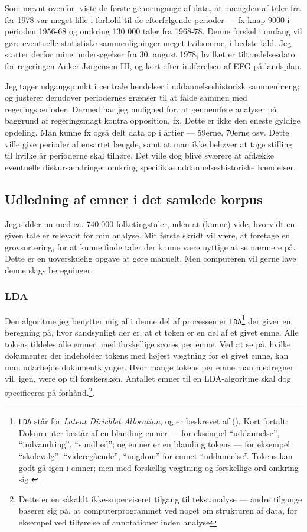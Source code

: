 Som nævnt ovenfor, viste de første gennemgange af data, at mængden af taler fra før 1978 var meget lille i forhold til de efterfølgende perioder — fx knap 9000 i perioden 1956-68 og omkring 130 000 taler fra 1968-78.
Denne forskel i omfang vil gøre eventuelle statistiske sammenligninger meget tvilsomme, i bedste fald.
Jeg starter derfor mine undersøgelser fra 30. august 1978, hvilket er tiltrædelsesdato for regeringen Anker Jørgensen III, og kort efter indførelsen af EFG på landsplan.

Jeg tager udgangspunkt i centrale hendelser i uddannelseshistorisk sammenhæng; og justerer derudover periodernes grænser til at falde sammen med regeringsperioder.
Dermed har jeg mulighed for, at gennemføre analyser på baggrund af regeringsmagt kontra opposition, fx.
Dette er ikke den eneste gyldige opdeling.
Man kunne fx også delt data op i årtier — 59erne, 70erne osv.
Dette ville give perioder af ensartet længde, samt at man ikke behøver at tage stilling til hvilke år perioderne skal tilhøre.
Det ville dog blive sværere at afdække eventuelle diskursændringer omkring specifikke uddannelseshistoriske hændelser.

\subsection{Udledning af emner i det samlede korpus}

Jeg sidder nu med ca. 740,000 folketingstaler, uden at (kunne) vide, hvorvidt en given tale er relevant for min analyse.
Mit første skridt vil være, at foretage en grovsortering, for at kunne finde taler der kunne være nyttige at se nærmere på.
Dette er en uoverskuelig opgave at gøre manuelt.
Men computeren vil gerne lave denne slags beregninger.

\subsubsection{LDA}
Den algoritme jeg benytter mig af i denne del af processen er \texttt{LDA}\footnote{\texttt{LDA} står for \textit{Latent Dirichlet Allocation}, og er beskrevet af \citeauthor{bleiLatentDirichletAllocation2003} (\citeyear{bleiLatentDirichletAllocation2003}). Kort fortalt: Dokumenter består af en blanding emner --- for eksempel “uddannelse”, “indvandring”, “sundhed”; og emner er en blanding tokens --- for eksempel “skolevalg”, “videregående”, “ungdom” for emnet “uddannelse”. Tokens kan godt gå igen i emner; men med forskellig vægtning og forskellige ord omkring sig \autocite[s. 86]{silge2017text}
}
der giver en beregning på, hvor sandsynligt der er, at et token er en del af et givet emne.
Alle tokens tildeles alle emner, med forskellige scores per emne.
Ved at se på, hvilke dokumenter der indeholder tokens med højest vægtning for et givet emne, kan man udarbejde dokumentklynger.
Hvor mange tokens per emne man medregner vil, igen, være op til forskerskøn.
Antallet emner til en LDA-algoritme skal dog specificeres på forhånd.\footnote{Dette er en såkaldt ikke-superviseret tilgang til tekstanalyse --- andre tilgange baserer sig på, at computerprogrammet ved noget om strukturen af data, for eksempel ved tilførelse af annotationer inden analyse}.

